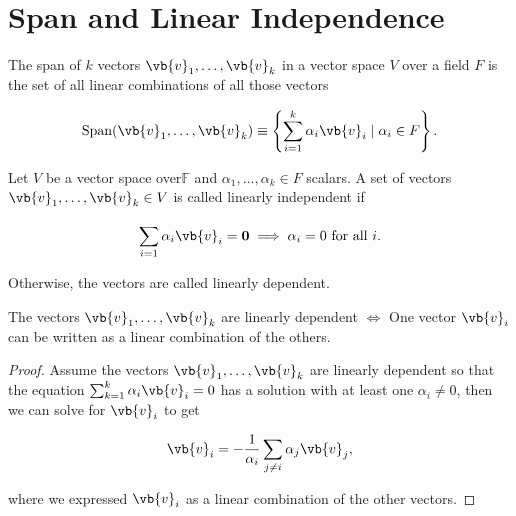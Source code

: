 \documentclass[a4paper,12pt]{report}
\begin{document}
\section{Span and Linear Independence}

\begin{definition}
    The span of \(k\) vectors \(\vb{v} _{1} , \ldots , \vb{v} _{k} \) in a vector space \(V\) over a field \(F\) is the set of all linear combinations of all those vectors
\end{definition}

\begin{equation}
    \text{Span} (\vb{v} _{1}, \ldots ,\vb{v} _{k}  ) \equiv  \left\{\sum_{i=1}^{k} \alpha _{i}\vb{v} _{i} \mid  \alpha _{i}\in F    \right\}.
\end{equation}

\begin{definition}
Let \(V\) be a vector space over\(\mathbb{F}\) and \(\alpha _{1}, \ldots , \alpha _{k} \in  F  \) scalars. A set of vectors \(\vb{v} _{1}, \ldots , \vb{v} _{k} \in V\) is called linearly independent if 

\begin{equation}
    \sum_{i=1}^{} \alpha _{i} \vb{v} _{i} = \boldsymbol{0} \implies \alpha _{i} = 0 \text{ for all } i.      
\end{equation}

Otherwise, the vectors are called linearly dependent. 
\end{definition}

\begin{corollary}
The vectors \(\vb{v} _{1}, \ldots , \vb{v} _{k}  \) are linearly dependent \(\iff \) One vector \(\vb{v} _{i} \) can be written as a linear combination of the others. 
\end{corollary}

\begin{proof}
Assume the vectors \(\vb{v} _{1}, \ldots , \vb{v} _{k}  \) are linearly dependent so that the equation \(\sum_{k=1}^{k} \alpha _{i} \vb{v} _{i}  = 0\) has a solution with at least one \(\alpha _{i} \neq 0 \), then we can solve for \(\vb{v} _{i} \) to get

\begin{equation}
    \vb{v} _{i} = -\frac{1}{\alpha _{i} } \sum_{j \neq i}^{} \alpha _{j} \vb{v} _{j} ,    
\end{equation}

where we expressed \(\vb{v} _{i} \) as a linear combination of the other vectors.

\end{proof}
\end{document}
